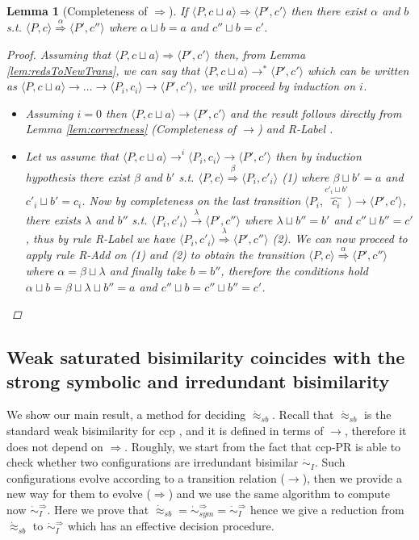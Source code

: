 \documentclass[copyright,creativecommons]{eptcs}
\newcommand{\rrarrow}{\longrightarrow}
\newcommand{\pairccp}[2]{\langle #1,#2 \rangle}
\newcommand{\trans}[1]{\stackrel{#1}{\rrarrow}}
\newcommand{\wsatbis}{\dot{\approx}_{sb}}
\newtheorem{lemma}{Lemma}
\newcommand{\newtrans}[1]{\stackrel{#1}{\Longrightarrow}}
\newcommand{\reds}{\rrarrow^*}
\newcommand{\A}{\alpha}
\newcommand{\B}{\beta}
\newcommand{\C}{\lambda}
\newcommand{\conf}[2]{\pairccp{#1}{#2}}
\newcommand{\transition}[5]{\conf{#1}{#2} \trans{#3} \conf{#4}{#5}}
\newcommand{\newtransition}[5]{\conf{#1}{#2} \newtrans{#3} \conf{#4}{#5}}
\newcommand{\lub}{\sqcup}
\newcommand{\irrbis}{\dot{\sim}_{I}}
\newcommand{\rLabel}{{\sf R-Label} }
\newcommand{\rAdd}{{\sf R-Add} }
\newcommand{\newirrbis}{\dot{\sim}^{\newtrans{}}_{I}}
\newcommand{\newsymbis}{\dot{\sim}^{\newtrans{}}_{sym}}
\begin{document}
\begin{lemma}[Completeness of $\newtrans{}$]
\label{lem:completenessNew}
If $\newtransition{P}{c \lub a}{}{P'}{c'}$ then there exist $\A$ and $b$ s.t. $\newtransition{P}{c}{\A}{P'}{c''}$ where $\A \lub b = a$ and $c'' \lub b = c'$.
\begin{proof}
Assuming that $\newtransition{P}{c \lub a}{}{P'}{c'}$ then,
from Lemma \ref{lem:redsToNewTrans},
we can say that $\conf{P}{c \lub a} \reds
\conf{P'}{c'}$ which can be written as $\conf{P}{c \lub a} \trans{} \dots \trans{} \conf{P_i}{c_i} \trans{} \conf{P'}{c'}$, we will proceed by
induction on $i$.
\begin{itemize}
 \item [(Base Case)] Assuming $i=0$ then $\transition{P}{c \lub a}{}{P'}{c'}$ and the
result follows directly from Lemma \ref{lem:correctness} (Completeness of $\trans{}$) and
\rLabel.
 \item [(Induction)] Let us assume that $\conf{P}{c \lub a} \trans{}^i \conf{P_i}{c_i}
\trans{} \conf{P'}{c'}$ then by induction hypothesis there exist $\B$ and $b'$ s.t.
$\newtransition{P}{c}{\B}{P_i}{c'_i}$ (1) where $\B \lub b' = a$ and $c'_i \lub b' =
c_i$. Now by completeness on the last transition $\transition{P_i}
{\overbrace{c_i}^{c'_i \lub b'}}{}{P'}{c'}$, there exists $\C$ and $b''$ s.t.
$\transition{P_i}{c'_i}{\C}{P'}{c''}$ where $\C \lub b'' = b'$ and $c'' \lub b'' =
c'$, thus by rule \rLabel we have $\newtransition{P_i}{c'_i}{\C}{P'}{c''}$ (2). We can
now proceed to apply rule \rAdd on (1) and (2) to obtain the transition
$\newtransition{P}{c}{\A}{P'}{c''}$ where $\A = \B \lub \C$ and finally take $b =
b''$, therefore the conditions hold $\A \lub b = \B \lub \C \lub b''= a$ and $c'' \lub
b = c'' \lub b'' = c'$.
\end{itemize}
\end{proof}
\end{lemma}

\subsection{Weak saturated bisimilarity coincides with the strong symbolic and irredundant bisimilarity} \label{ssec:weakToStrongCCP}
We show our main result, a method for deciding $\wsatbis$.
Recall that $\wsatbis$ is the standard weak bisimilarity for ccp \cite{Aristizabal:11:FOSSACS},
and it is defined in terms of $\trans{}$, therefore it does not depend on $\newtrans{}$.
Roughly, we start from the fact that ccp-PR is able to check whether
two configurations are irredundant bisimilar $\irrbis$. Such configurations evolve
according to a transition relation ($\trans{}$), then we provide a new way for them
to evolve ($\newtrans{}$) and we use the same algorithm to compute now $\newirrbis$.
Here we prove that $\wsatbis = \newsymbis = \newirrbis$ hence we give
a reduction from $\wsatbis$ to $\newirrbis$ which has an effective decision procedure.
\end{document}
